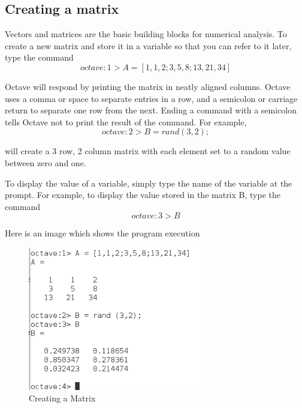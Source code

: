 \documentclass[a4paper,12pt]{article}
\begin{document}
\subsection{Creating a matrix}
\justifying
\par
Vectors and matrices are the basic building blocks for numerical analysis. To create a new matrix and store it in a variable so that you can refer to it later, type the command
\begin{equation}
    \label{simple_equation}
    octave:1> A = [ 1, 1, 2; 3, 5, 8; 13, 21, 34 ]
\end{equation}
\par
Octave will respond by printing the matrix in neatly aligned columns. Octave uses a comma or space to separate entries in a row, and a semicolon or carriage return to separate one row from the next. Ending a command with a semicolon tells Octave not to print the result of the command. For example,
\begin{equation}
    \label{simple_equation}
    octave:2> B = rand (3, 2);
\end{equation}
\par
will create a 3 row, 2 column matrix with each element set to a random value between zero and one.
\par
To display the value of a variable, simply type the name of the variable at the prompt. For example, to display the value stored in the matrix B, type the command
\begin{equation}
    \label{simple_equation}
    octave:3> B
\end{equation}
\par
Here is an image which shows the program execution
\begin{figure}[H]
    \centering
    \includegraphics[width=3.0in]{img/2.png}
    \caption{Creating a Matrix}
    \label{simulationfigure}
\end{figure}
\end{document}
